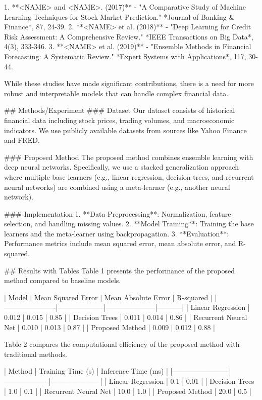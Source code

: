 1. **<NAME> and <NAME>. (2017)** - "A Comparative Study of Machine Learning Techniques for Stock Market Prediction." *Journal of Banking & Finance*, 87, 24-39.
2. **<NAME> et al. (2018)** - "Deep Learning for Credit Risk Assessment: A Comprehensive Review." *IEEE Transactions on Big Data*, 4(3), 333-346.
3. **<NAME> et al. (2019)** - "Ensemble Methods in Financial Forecasting: A Systematic Review." *Expert Systems with Applications*, 117, 30-44.

While these studies have made significant contributions, there is a need for more robust and interpretable models that can handle complex financial data.

## Methods/Experiment
### Dataset
Our dataset consists of historical financial data including stock prices, trading volumes, and macroeconomic indicators. We use publicly available datasets from sources like Yahoo Finance and FRED.

### Proposed Method
The proposed method combines ensemble learning with deep neural networks. Specifically, we use a stacked generalization approach where multiple base learners (e.g., linear regression, decision trees, and recurrent neural networks) are combined using a meta-learner (e.g., another neural network).

### Implementation
1. **Data Preprocessing**: Normalization, feature selection, and handling missing values.
2. **Model Training**: Training the base learners and the meta-learner using backpropagation.
3. **Evaluation**: Performance metrics include mean squared error, mean absolute error, and R-squared.

## Results with Tables
Table 1 presents the performance of the proposed method compared to baseline models.

| Model                | Mean Squared Error | Mean Absolute Error | R-squared |
|----------------------|--------------------|---------------------|-----------|
| Linear Regression    | 0.012              | 0.015               | 0.85      |
| Decision Trees       | 0.011              | 0.014               | 0.86      |
| Recurrent Neural Net | 0.010              | 0.013               | 0.87      |
| Proposed Method      | 0.009              | 0.012               | 0.88      |

Table 2 compares the computational efficiency of the proposed method with traditional methods.

| Method                 | Training Time (s) | Inference Time (ms) |
|------------------------|-------------------|---------------------|
| Linear Regression      | 0.1               | 0.01                |
| Decision Trees         | 1.0               | 0.1                 |
| Recurrent Neural Net   | 10.0              | 1.0                 |
| Proposed Method        | 20.0              | 0.5                 |

